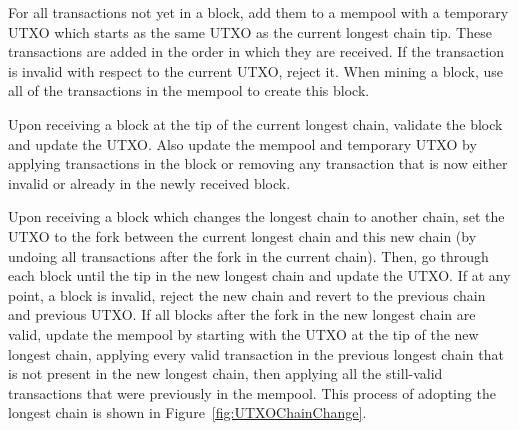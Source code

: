 For all transactions not yet in a block, add them to a mempool with a temporary UTXO which starts as the same UTXO as the current longest chain tip. These transactions are added in the order in which they are received. If the transaction is invalid with respect to the current UTXO, reject it. When mining a block, use all of the transactions in the mempool to create this block.

Upon receiving a block at the tip of the current longest chain, validate the block and update the UTXO. Also update the mempool and temporary UTXO by applying transactions in the block or removing any transaction that is now either invalid or already in the newly received block.

Upon receiving a block which changes the longest chain to another chain, set the UTXO to the fork between the current longest chain and this new chain (by undoing all transactions after the fork in the current chain). Then, go through each block until the tip in the new longest chain and update the UTXO. If at any point, a block is invalid, reject the new chain and revert to the previous chain and previous UTXO. If all blocks after the fork in the new longest chain are valid, update the mempool by starting with the UTXO at the tip of the new longest chain, applying every valid transaction in the previous longest chain that is not present in the new longest chain, then applying all the still-valid transactions that were previously in the mempool. This process of adopting the longest chain is shown in Figure~\ref{fig:UTXOChainChange}. \\

